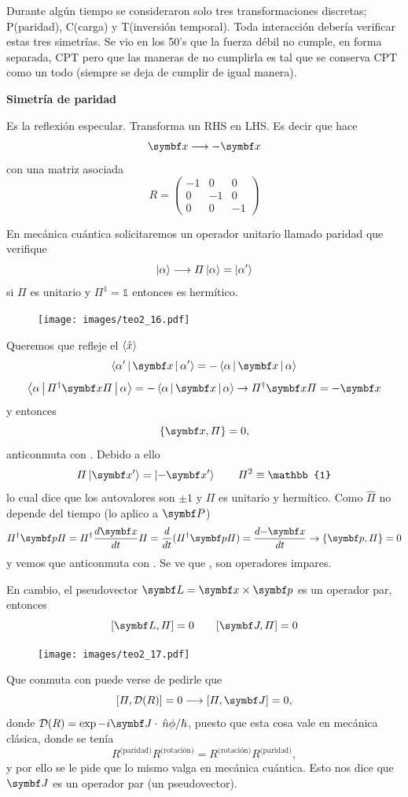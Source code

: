 \documentclass[10pt,oneside]{CBFT_book}
\begin{document}
Durante algún tiempo se consideraron solo tres transformaciones discretas; P(paridad), C(carga) y
T(inversión temporal).
Toda interacción debería verificar estas tres simetrías. Se vio en los 50's que la fuerza débil
no cumple, en forma separada, CPT pero que las maneras de no cumplirla es tal que se conserva
CPT como un todo (siempre se deja de cumplir de igual manera).

{\bf  Simetría de paridad}

Es la reflexión especular.
Transforma un RHS en LHS. Es decir que hace 
\[
	\vb{x} \longrightarrow - \vb{x}
\]
con una matriz asociada
\[
	R = \begin{pmatrix}
	 -1 & 0 & 0 \\
	 0 & -1 & 0 \\
	 0 & 0 & -1
	\end{pmatrix}
\]

En mecánica cuántica solicitaremos un operador unitario llamado paridad que verifique 
\[
	\Ket{\alpha} \longrightarrow \Pi\Ket{\alpha} = \Ket{\alpha'}
\]
si $\Pi$ es unitario y $\Pi^1=\mathbb{1}$ entonces es hermítico.
\begin{figure}[htb]
	\begin{center}
	\texttt{[image: images/teo2\_16.pdf]}
	\end{center}
	\caption{}
\end{figure} 
Queremos que refleje el $\Braket{\hat{x}}$ 
\[
	\Braket{\alpha'|\vb{x}|\alpha'} = - \Braket{\alpha|\vb{x}|\alpha} 
\]
\[
	\Braket{\alpha|\Pi^\dagger\vb{x}\Pi|\alpha} = - \Braket{\alpha|\vb{x}|\alpha} \rightarrow
	\Pi^\dagger\vb{x}\Pi = -\vb{x} 
\]
y entonces 
\[
	\{\vb{x},\Pi\} = 0,
\]
anticonmuta con . Debido a ello 
\[
	\Pi\Ket{\vb{x}'} = \Ket{-\vb{x}'} \qquad \Pi^2 \equiv \mathbb{1}
\]
lo cual dice que los autovalores son $\pm 1$ y $\Pi$ es unitario y hermítico.
Como $\hat{\Pi}$ no depende del tiempo (lo aplico a $\vb P$)
\[
	\Pi^\dagger\vb{p}\Pi = \Pi^\dagger\dtot{\vb{x}}{t}\Pi = \dtot{}{t}(\Pi^\dagger\vb{p}\Pi) = 
	\dtot{-\vb{x}}{t} \rightarrow \{\vb{p},\Pi\}= 0
\]
y vemos que anticonmuta con .
Se ve que ,  son operadores impares. 

En cambio, el pseudovector $\vb{L}=\vb{x}\times\vb{p}$ es un operador par, entonces 
\[
	[\vb{L},\Pi] = 0 \qquad [\vb{J},\Pi] = 0
\]
\begin{figure}[htb]
	\begin{center}
	\texttt{[image: images/teo2\_17.pdf]}
	\end{center}
	\caption{}
\end{figure} 
Que conmuta con  puede verse de pedirle que 
\[
	[\Pi,\mathcal{D}(R)] = 0 \longrightarrow [\Pi,\vb{J}] = 0 ,
\]
donde $\mathcal{D}(R) = \exp{ - i \vb J \cdot \nver \phi / \hbar}$, puesto que esta cosa vale en 
mecánica clásica, donde se tenía
\[
	R^{\text{(paridad)}}R^{\text{(rotación)}} = R^{\text{(rotación)}} R^{\text{(paridad)}},
\]
y por ello se le pide que lo mismo valga en mecánica cuántica.
Esto nos dice que $\vb J$ es un operador par (un pseudovector).
\end{document}
